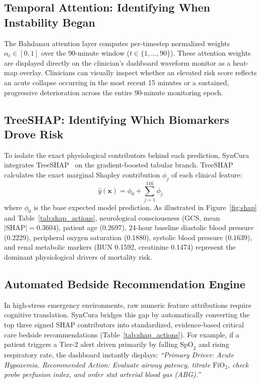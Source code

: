 \documentclass[conference]{IEEEtran}
\begin{document}
\subsection{Temporal Attention: Identifying When Instability Began}
The Bahdanau attention layer computes per-timestep normalized weights $\alpha_t \in [0, 1]$ over the 90-minute window ($t \in \{1, \dots, 90\}$). These attention weights are displayed directly on the clinician's dashboard waveform monitor as a heat-map overlay. Clinicians can visually inspect whether an elevated risk score reflects an acute collapse occurring in the most recent 15 minutes or a sustained, progressive deterioration across the entire 90-minute monitoring epoch.

\subsection{TreeSHAP: Identifying Which Biomarkers Drove Risk}
To isolate the exact physiological contributors behind each prediction, SynCura integrates TreeSHAP~\cite{lundberg2017} on the gradient-boosted tabular branch. TreeSHAP calculates the exact marginal Shapley contribution $\phi_j$ of each clinical feature:
\begin{equation}
    \hat{y}(\mathbf{x}) = \phi_0 + \sum_{j=1}^{116} \phi_j
\end{equation}
where $\phi_0$ is the base expected model prediction. As illustrated in Figure~\ref{fig:shap} and Table~\ref{tab:shap_actions}, neurological consciousness (GCS, mean $|\mathrm{SHAP}| = 0.3604$), patient age (0.2697), 24-hour baseline diastolic blood pressure (0.2229), peripheral oxygen saturation (0.1880), systolic blood pressure (0.1639), and renal metabolic markers (BUN 0.1592, creatinine 0.1474) represent the dominant physiological drivers of mortality risk.

\subsection{Automated Bedside Recommendation Engine}
In high-stress emergency environments, raw numeric feature attributions require cognitive translation. SynCura bridges this gap by automatically converting the top three signed SHAP contributors into standardized, evidence-based critical care bedside recommendations (Table~\ref{tab:shap_actions}). For example, if a patient triggers a Tier-2 alert driven primarily by falling $\text{SpO}_2$ and rising respiratory rate, the dashboard instantly displays: \textit{``Primary Driver: Acute Hypoxemia. Recommended Action: Evaluate airway patency, titrate $\text{FiO}_2$, check probe perfusion index, and order stat arterial blood gas (ABG).''}
\end{document}
